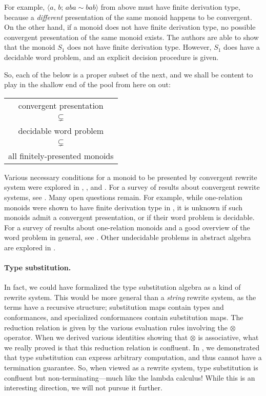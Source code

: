 \documentclass[../generics]{subfiles}
\begin{document}
For example, $\langle a,\,b;\,aba\sim bab\rangle$ from above must have finite derivation type, because a \emph{different} presentation of the same monoid happens to be convergent. On the other hand, if a monoid does not have finite derivation type, no possible convergent presentation of the same monoid exists. The authors are able to show that the monoid $S_1$ does not have finite derivation type. However, $S_1$ does have a decidable word problem, and an explicit decision procedure is given.

So, each of the below is a proper subset of the next, and we shall be content to play in the shallow end of the pool from here on out:
\begin{center}
\begin{tabular}{c}
convergent presentation \\
$\subsetneq$ \\
decidable word problem \\
$\subsetneq$ \\
all finitely-presented monoids
\end{tabular}
\end{center}
Various necessary conditions for a monoid to be presented by convergent rewrite system were explored in \cite{fptype}, \cite{fdtfp3}, and \cite{mild}. For a survey of results about convergent rewrite systems, see \cite{Otto1997}. Many open questions remain. For example, while one-relation monoids were shown to have finite derivation type in \cite{KOBAYASHI2000547}, it is unknown if such monoids admit a convergent presentation, or if their word problem is decidable. For a survey of results about one-relation monoids and a good overview of the word problem in general, see \cite{onerelation}. Other undecidable problems in abstract algebra are explored in \cite{tarski1953undecidable}.

\paragraph{Type substitution.} In fact, we could have formalized the type substitution algebra as a kind of rewrite system. This would be more general than a \emph{string} rewrite system, as the terms have a recursive structure; substitution maps contain types and conformances, and specialized conformances contain substitution maps. The reduction relation is given by the various evaluation rules involving the $\otimes$ operator. When we derived various identities showing that $\otimes$ is associative, what we really proved is that this reduction relation is confluent. In , we demonstrated that type substitution can express arbitrary computation, and thus cannot have a termination guarantee. So, when viewed as a rewrite system, type substitution is confluent but non-terminating---much like the lambda calculus! While this is an interesting direction, we will not pursue it further.
\end{document}
